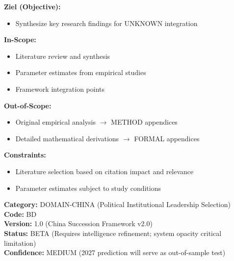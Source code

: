\documentclass[11pt]{article}
\begin{document}
\begin{tcolorbox}[
    colback=orange!5!white,
    colframe=orange!75!black,
    title={\textbf{Appendix Scope: Ziel / In-Scope / Out-of-Scope / Constraints}},
    fonttitle=\bfseries
]

\textbf{Ziel (Objective):}
\begin{itemize}[nosep]
    \item Synthesize key research findings for UNKNOWN integration
\end{itemize}

\textbf{In-Scope:}
\begin{itemize}[nosep]
    \item Literature review and synthesis
    \item Parameter estimates from empirical studies
    \item Framework integration points
\end{itemize}

\textbf{Out-of-Scope:}
\begin{itemize}[nosep]
    \item Original empirical analysis $\rightarrow$ METHOD appendices
    \item Detailed mathematical derivations $\rightarrow$ FORMAL appendices
\end{itemize}

\textbf{Constraints:}
\begin{itemize}[nosep]
    \item Literature selection based on citation impact and relevance
    \item Parameter estimates subject to study conditions
\end{itemize}

\end{tcolorbox}

\begin{center}
\colorbox{lightgreen!30}{\begin{minipage}{0.95\textwidth}
\textbf{Category:} DOMAIN-CHINA (Political Institutional Leadership Selection) \\
\textbf{Code:} BD \\
\textbf{Version:} 1.0 (China Succession Framework v2.0) \\
\textbf{Status:} BETA (Requires intelligence refinement; system opacity critical limitation) \\
\textbf{Confidence:} MEDIUM (2027 prediction will serve as out-of-sample test)
\end{minipage}}
\end{center}
\end{document}
